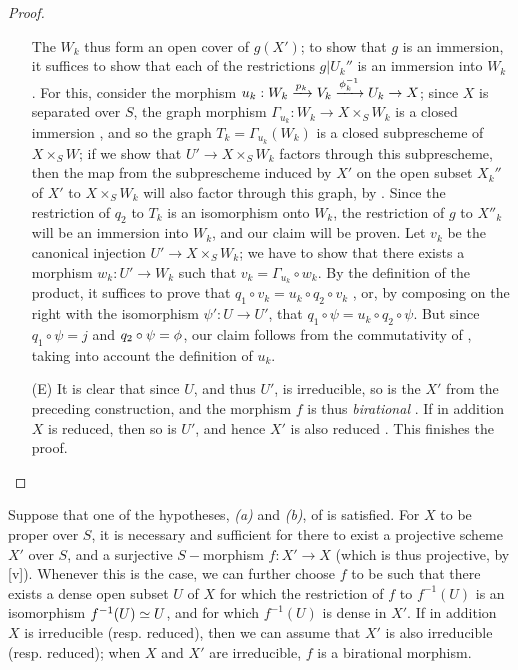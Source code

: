 \begin{proof}
\begin{enumerate}
    The $W_k$ thus form an open cover of $g(X')$; to show that $g$ is an immersion, it suffices to show that each of the restrictions $g|U_k''$ is an immersion into $W_k$ .
    For this, consider the morphism $u_k:W_k\xrightarrow{p_k}V_k\xrightarrow{\vphi_k^{-1}}U_k\to X$; since $X$ is separated over $S$, the graph morphism $\Gamma_{u_k}:W_k\to X\times_S W_k$ is a closed immersion , and so the graph $T_k=\Gamma_{u_k}(W_k)$ is a closed subprescheme of $X\times_S W$;
    if we show that $U'\to X\times_S W_k$ factors through this subprescheme, then the map from the subprescheme induced by $X'$ on the open subset $X_k''$ of $X'$ to $X\times_S W_k$ will also factor through this graph, by .
    Since the restriction of $q_2$ to $T_k$ is an isomorphism onto $W_k$, the restriction of $g$ to $X''_k$ will be an immersion into $W_k$, and our claim will be proven.
    Let $v_k$ be the canonical injection $U'\to X\times_S W_k$; we have to show that there exists a morphism $w_k:U'\to W_k$ such that $v_k=\Gamma_{u_k}\circ w_k$.
    By the definition of the product, it suffices to prove that $q_1\circ v_k=u_k\circ q_2\circ v_k$ , or, by composing on the right
    with the isomorphism $\psi':U\to U'$, that $q_1\circ\psi=u_k\circ q_2\circ\psi$.
    But since $q_1\circ\psi=j$ and $q_2\circ\psi=\phi$, our claim follows from the commutativity of , taking into account the definition of $u_k$.
  \item[(E)] It is clear that since $U$, and thus $U'$, is irreducible, so is the $X'$ from the preceding construction, and the morphism $f$ is thus \emph{birational} .
    If in addition $X$ is reduced, then so is $U'$, and hence $X'$ is also reduced .
    This finishes the proof.
\end{enumerate}
\end{proof}

\begin{corollary}[5.6.2]
\label{II.5.6.2}
Suppose that one of the hypotheses, \emph{(a)} and \emph{(b)}, of  is satisfied.
For $X$ to be proper over $S$, it is necessary and sufficient for there to exist a projective scheme $X'$ over $S$, and a surjective $S-$morphism $f:X'\to X$ (which is thus projective, by [v]).
Whenever this is the case, we can further choose $f$ to be such that there exists a dense open subset $U$ of $X$ for which the restriction of $f$ to $f^{-1}(U)$ is an isomorphism $f^{-1}(U)\simeq U$, and for which $f^{-1}(U)$ is dense in $X'$.
If in addition $X$ is irreducible (resp. reduced), then we can assume that $X'$ is also irreducible (resp. reduced); when $X$ and $X'$ are irreducible, $f$ is a birational morphism.
\end{corollary}

